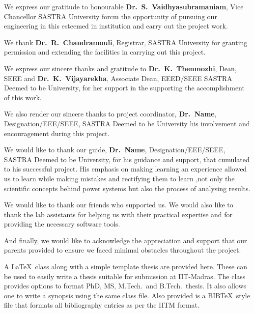 \documentclass[a4paper, 12pt, oneside]{sastra}
\begin{document}
	\hspace*{12pt} We express our gratitude to honourable \textbf{Dr.~S.~Vaidhyasubramaniam}, Vice Chancellor SASTRA University forcm the opportunity of pursuing our engineering in this esteemed in institution and carry out the project work.
	
	\par We thank \textbf{Dr.~R.~Chandramouli}, Registrar, SASTRA University for granting permission and extending the facilities in carrying out this project.
	
	\par We express our sincere thanks and gratitude to \textbf{Dr.~K.~Thenmozhi}, Dean, SEEE and \textbf{Dr.~K.~Vijayarekha}, Associate Dean, EEED/SEEE SASTRA Deemed to be University, for her support in the supporting the accomplishment of this work.
	
	\par We also render our sincere thanks to project coordinator, \textbf{Dr.~Name}, Designation/EEE/SEEE, SASTRA Deemed to be University his involvement and encouragement during this project.

\par We would like to thank our guide, \textbf{Dr.~Name}, Designation/EEE/SEEE, SASTRA Deemed to be University, for his guidance and support, that cumulated to his successful project. His emphasis on making learning an experience allowed us to learn while making mistakes and rectifying them to learn ,not only the scientific concepts behind power systems but also the process of analysing results.
	
	\par We would like to thank our friends who supported us. We would also like to thank the lab assistants for helping us with their practical expertise and for providing the necessary software tools.
	
	\par And finally, we would like to acknowledge the appreciation and support that our parents provided to ensure we faced minimal obstacles throughout the project.
	\pagebreak
	
	\abstract
	
	
	\vspace*{24pt}
	
	\noindent A \LaTeX\ class along with a simple template thesis are provided here.  These can be used to easily write a thesis suitable for submission at IIT-Madras.  The class provides options to format PhD, MS, M.Tech.\ and B.Tech.\ thesis.  It also allows one to write a synopsis using the same class file.  Also provided is a BIB\TeX\ style file that formats all bibliography entries as per the IITM format.
	
\end{document}
